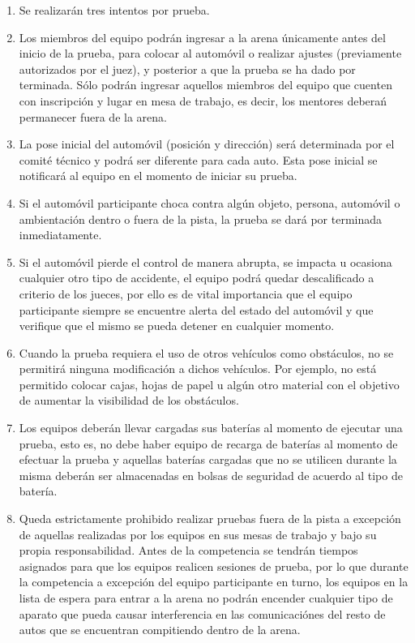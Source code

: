 \documentclass[letterpaper,12pt]{article}
\begin{document}
\begin{enumerate}
\item Se realizarán tres intentos por prueba. 

\item Los miembros del equipo podrán ingresar a la arena únicamente antes del inicio de la prueba, para colocar al automóvil o realizar ajustes (previamente autorizados por el juez), y posterior a que la prueba se ha dado por terminada. Sólo podrán ingresar aquellos miembros del equipo que cuenten con inscripción y lugar en mesa de trabajo, es decir, los mentores deberań permanecer fuera de la arena.

\item La pose inicial del automóvil (posición y dirección) será determinada por el comité técnico y podrá ser diferente para cada auto. Esta pose inicial se notificará al equipo en el momento de iniciar su prueba.

\item Si el automóvil participante choca contra algún objeto, persona, automóvil o ambientación dentro o fuera de la pista, la prueba se dará por terminada inmediatamente.

\item Si el automóvil pierde el control de manera abrupta, se impacta u ocasiona cualquier otro tipo de accidente, el equipo podrá quedar descalificado a criterio de los jueces, por ello es de vital importancia que el equipo participante siempre se encuentre alerta del estado del automóvil y que verifique que el mismo se pueda detener en cualquier momento.

\item Cuando la prueba requiera el uso de otros vehículos como obstáculos, no se permitirá ninguna modificación a dichos vehículos. Por ejemplo, no está permitido colocar cajas, hojas de papel u algún otro material con el objetivo de aumentar la visibilidad de los obstáculos. 

\item Los equipos deberán llevar cargadas sus baterías al momento de ejecutar una prueba, esto es, no debe haber equipo de recarga de baterías al momento de efectuar la prueba y aquellas baterías cargadas que no se utilicen durante la misma deberán ser almacenadas en bolsas de seguridad de acuerdo al tipo de batería.

\item Queda estrictamente prohibido realizar pruebas fuera de la pista a excepción de aquellas realizadas por los equipos en sus mesas de trabajo y bajo su propia responsabilidad. Antes de la competencia se tendrán tiempos asignados para que los equipos realicen sesiones de prueba, por lo que durante la competencia a excepción del equipo participante en turno, los equipos en la lista de espera para entrar a la arena no podrán encender cualquier tipo de aparato que pueda causar interferencia en las comunicaciónes del resto de autos que se encuentran compitiendo dentro de la arena.


\end{enumerate}
\end{document}

